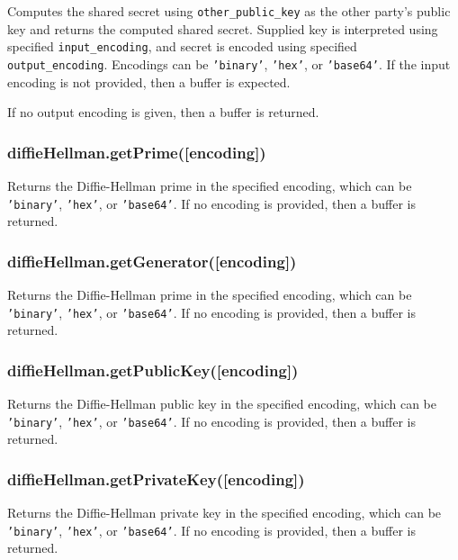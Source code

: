 Computes the shared secret using \texttt{other\_public\_key} as the
other party's public key and returns the computed shared secret.
Supplied key is interpreted using specified \texttt{input\_encoding},
and secret is encoded using specified \texttt{output\_encoding}.
Encodings can be \texttt{'binary'}, \texttt{'hex'}, or
\texttt{'base64'}. If the input encoding is not provided, then a buffer
is expected.

If no output encoding is given, then a buffer is returned.

\subsubsection{diffieHellman.getPrime({[}encoding{]})}\label{diffiehellman.getprimeencoding}

Returns the Diffie-Hellman prime in the specified encoding, which can be
\texttt{'binary'}, \texttt{'hex'}, or \texttt{'base64'}. If no encoding
is provided, then a buffer is returned.

\subsubsection{diffieHellman.getGenerator({[}encoding{]})}\label{diffiehellman.getgeneratorencoding}

Returns the Diffie-Hellman prime in the specified encoding, which can be
\texttt{'binary'}, \texttt{'hex'}, or \texttt{'base64'}. If no encoding
is provided, then a buffer is returned.

\subsubsection{diffieHellman.getPublicKey({[}encoding{]})}\label{diffiehellman.getpublickeyencoding}

Returns the Diffie-Hellman public key in the specified encoding, which
can be \texttt{'binary'}, \texttt{'hex'}, or \texttt{'base64'}. If no
encoding is provided, then a buffer is returned.

\subsubsection{diffieHellman.getPrivateKey({[}encoding{]})}\label{diffiehellman.getprivatekeyencoding}

Returns the Diffie-Hellman private key in the specified encoding, which
can be \texttt{'binary'}, \texttt{'hex'}, or \texttt{'base64'}. If no
encoding is provided, then a buffer is returned.

